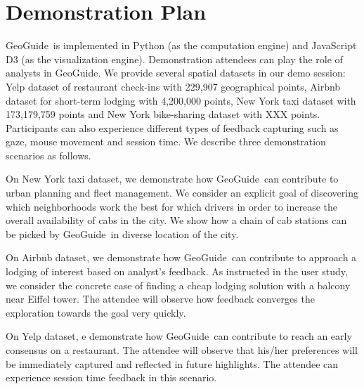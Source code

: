 \documentclass{vldb}
\newcommand{\framework}{{\sc GeoGuide}}
\begin{document}
\section{Demonstration Plan}
\label{sec:demo_plan}
 \framework\ is implemented in Python (as the computation engine) and JavaScript D3 (as the visualization engine). Demonstration attendees can play the role of analysts in \framework. We provide several spatial datasets in our demo session: Yelp dataset of restaurant check-ins with 229,907 geographical points, Airbnb dataset for short-term lodging with 4,200,000 points, New York taxi dataset with 173,179,759 points and New York bike-sharing dataset with XXX points. Participants can also experience different types of feedback capturing such as gaze, mouse movement and session time. We describe three demonstration scenarios as follows.

\vspace{5pt}
 On New York taxi dataset, we demonstrate how \framework\ can contribute to urban planning and fleet management. We consider an explicit goal of discovering which neighborhoods work the best for which drivers in order to increase the overall availability of cabs in the city. We show how a chain of cab stations can be picked by \framework\ in diverse location of the city.

\vspace{5pt}
 On Airbnb dataset, we demonstrate how \framework\ can contribute to approach a lodging of interest based on analyst's feedback. As instructed in the user study, we consider the concrete case of finding a cheap lodging solution with a balcony near Eiffel tower. The attendee will observe how feedback converges the exploration towards the goal very quickly.

\vspace{5pt}
 On Yelp dataset, e demonstrate how \framework\ can contribute to reach an early consensus on a restaurant. The attendee will observe that his/her preferences will be immediately captured and reflected in future highlights. The attendee can experience session time feedback in this scenario.



\end{document}
